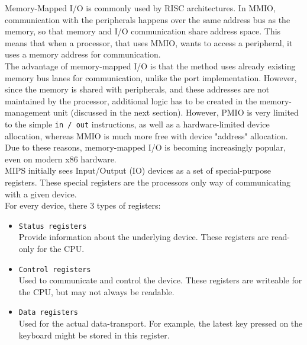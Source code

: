 Memory-Mapped I/O is commonly used by RISC architectures. In MMIO,
communication with the peripherals happens over the same address bus as the
memory, so that memory and I/O communication share address space. This means
that when a processor, that uses MMIO, wants to access a peripheral, it uses a
memory address for communication.\\
The advantage of memory-mapped I/O is that the method uses already existing
memory bus lanes for communication, unlike the port implementation. However,
since the memory is shared with peripherals, and these addresses are not
maintained by the processor, additional logic has to be created in the
memory-management unit (discussed in the next section). However, PMIO is very limited to the simple \texttt{in
/ out} instructions, as well as a hardware-limited device allocation, whereas
MMIO is much more free with device "address" allocation. Due to these reasons,
memory-mapped I/O is becoming increasingly popular, even on modern x86
hardware\cite{osdev:io_ports}.\\
MIPS initially sees Input/Output (IO) devices as a set of special-purpose registers. These
special registers are the processors only way of communicating with a given
device.\\
For every device, there 3 types of
registers\cite{cs_uwm:memory_mapped_io}\cite{imgtec:pra}:
\begin{itemize}
	\item \texttt{Status registers}\\
	Provide information about the underlying device. These registers are
	read-only for the CPU.

	\item \texttt{Control registers}\\
	Used to communicate and control the device. These registers are
	writeable for the CPU, but may not always be readable.

	\item \texttt{Data registers}\\
	Used for the actual data-transport. For example, the latest key pressed
	on the keyboard might be stored in this register.
\end{itemize}

